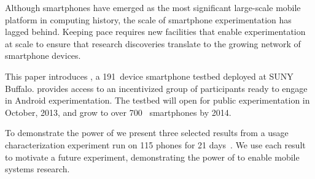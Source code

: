 Although smartphones have emerged as the most significant large-scale mobile
platform in computing history, the scale of smartphone experimentation has
lagged behind. Keeping pace requires new facilities that enable
experimentation at scale to ensure that research discoveries translate to the
growing network of smartphone devices.


This paper introduces \PhoneLab{}, a 191~device smartphone testbed deployed
at SUNY Buffalo. \PhoneLab{} provides access to an incentivized group of
participants ready to engage in Android experimentation. The testbed will
open for public experimentation in October, 2013, and grow to over
700~ smartphones by 2014.



To demonstrate the power of \PhoneLab{} we present three selected results
from a usage characterization experiment run on 115 phones for 21
days~. We use each result to
motivate a future \PhoneLab{} experiment, demonstrating the power of
\PhoneLab{} to enable mobile systems research.

